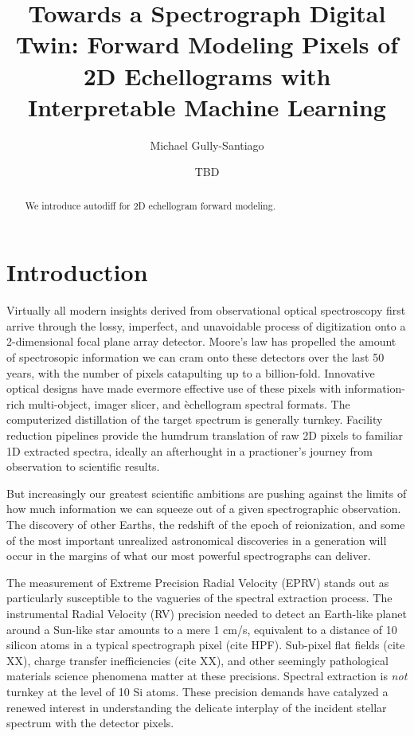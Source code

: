 \documentclass[twocolumn]{aastex63}
\begin{document}
\title{Towards a Spectrograph Digital Twin: Forward Modeling Pixels of 2D Echellograms with Interpretable Machine Learning}

\author{Michael Gully-Santiago}

\author{TBD}


\begin{abstract}

  We introduce autodiff for 2D echellogram forward modeling.

\end{abstract}



\section{Introduction}\label{sec:intro}

Virtually all modern insights derived from observational optical spectroscopy first arrive through the lossy, imperfect, and unavoidable process of digitization onto a 2-dimensional focal plane array detector.  Moore's law has propelled the amount of spectrosopic information we can cram onto these detectors over the last 50 years, with the number of pixels catapulting up to a billion-fold.  Innovative optical designs have made evermore effective use of these pixels with information-rich multi-object, imager slicer, and \`echellogram spectral formats.  The computerized distillation of the target spectrum is generally turnkey.  Facility reduction pipelines provide the humdrum translation of raw 2D pixels to familiar 1D extracted spectra, ideally an afterhought in a practioner's journey from observation to scientific results.

But increasingly our greatest scientific ambitions are pushing against the limits of how much information we can squeeze out of a given spectrographic observation.  The discovery of other Earths, the redshift of the epoch of reionization, and some of the most important unrealized astronomical discoveries in a generation will occur in the margins of what our most powerful spectrographs can deliver.

The measurement of Extreme Precision Radial Velocity (EPRV) stands out as particularly susceptible to the vagueries of the spectral extraction process.  The instrumental Radial Velocity (RV) precision needed to detect an Earth-like planet around a Sun-like star amounts to a mere 1 cm/s, equivalent to a distance of 10 silicon atoms in a typical spectrograph pixel (cite HPF).  Sub-pixel flat fields (cite XX), charge transfer inefficiencies (cite XX), and other seemingly pathological materials science phenomena matter at these precisions.  Spectral extraction is \emph{not} turnkey at the level of 10 Si atoms.  These precision demands have catalyzed a renewed interest in understanding the delicate interplay of the incident stellar spectrum with the detector pixels.
\end{document}
